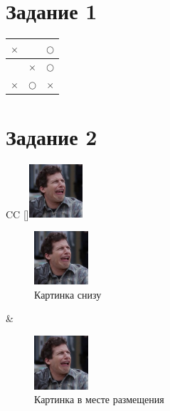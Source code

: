 \documentclass[a4paper, 12pt]{article}
\begin{document}
\graphicspath{{images/}{images2/}} %

\author{М.А.Гейне}
\bmstutitlelab

\hypersetup{
    linkcolor=black
}

\section{Задание 1}
\begin{tabular}{c|c|c}
    $\times$ & & $\bigcirc$ \\ \hline
    & $\times$ & $\bigcirc$ \\ \hline
    $\times$ & $\bigcirc$ & $\times$
\end{tabular}
\pagebreak

\section{Задание 2}
\begin{table}[h]
\begin{tabulary}{\textwidth}{CC}
    [\linewidth]{\includegraphics[height=2cm,keepaspectratio]{jake.jpg}}
    
    \lipsum[1]
    \begin{subfigure}[b]{\linewidth}
        \centering
        \includegraphics[height=2cm,keepaspectratio]{jake.jpg}
        \caption{Картинка снизу}
    \end{subfigure}    
    &
    \lipsum[1]
    
    \begin{subfigure}[b]{\linewidth}
        \centering
        \includegraphics[height=2cm,keepaspectratio]{jake.jpg}
        \caption{Картинка в месте размещения}
    \end{subfigure} 
\end{tabulary}
\end{table}
\end{document}
